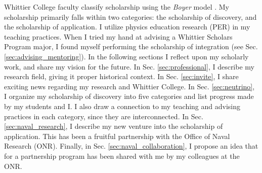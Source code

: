 \documentclass[../../main.tex]{subfiles}
\begin{document}
\label{sec:scholarship}

Whittier College faculty classify scholarship using the \textit{Boyer} model \cite{boyer}.  My scholarship primarily falls within two categories: the scholarship of discovery, and the scholarship of application.  I utilize physics education research (PER) in my teaching practices.  When I tried my hand at advising a Whittier Scholars Program major, I found myself performing the scholarship of integration (see Sec. \ref{sec:advising_mentoring}).  In the following sections I reflect upon my scholarly work, and share my vision for the future.  In Sec. \ref{sec:professional}, I describe my research field, giving it proper historical context.  In Sec. \ref{sec:invite}, I share exciting news regarding my research and Whittier College.  In Sec. \ref{sec:neutrino}, I organize my scholarship of discovery into five categories and list progress made by my students and I.  I also draw a connection to my teaching and advising practices in each category, since they are interconnected.  In Sec. \ref{sec:naval_research}, I describe my new venture into the scholarship of application.  This has been a fruitful partnership with the Office of Naval Research (ONR).  Finally, in Sec. \ref{sec:naval_collaboration}, I propose an idea that for a partnership program has been shared with me by my colleagues at the ONR.

%

\begin{flushleft}

\end{flushleft}

%

\begin{flushleft}

\end{flushleft}

%

\begin{flushleft}

\end{flushleft}

%

\begin{flushleft}

\end{flushleft}
\end{document}
